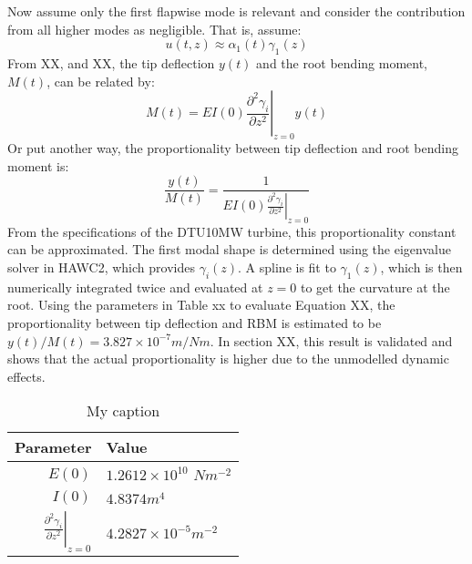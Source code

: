 Now assume only the first flapwise mode is relevant and consider the contribution from all higher modes as negligible. That is, assume:
\begin{equation}
    u(t, z) \approx  \alpha_1(t) \gamma_1(z)
\end{equation}
From XX, and XX, the tip deflection $y(t)$ and the root bending moment, $M(t)$, can be related by:
\begin{equation}
    M(t) = EI(0)\left.\frac{\partial ^2 \gamma_i}{\partial z^2}\right\vert_{z=0}y(t)
\end{equation}
Or put another way, the proportionality between tip deflection and root bending moment is:
\begin{equation}
    \frac{y(t)}{M(t)} = \frac{1}{EI(0)\left.\frac{\partial ^2 \gamma_i}{\partial z^2}\right\vert_{z=0}}
\end{equation}
From the specifications of the DTU10MW turbine, this proportionality constant can be approximated. The first modal shape is determined using the eigenvalue solver in HAWC2, which provides $\gamma_i(z)$. A spline is fit to $\gamma_1(z)$, which is then numerically integrated twice and evaluated at $z=0$ to get the curvature at the root. Using the parameters in Table xx to evaluate Equation XX, the proportionality between tip deflection and RBM is estimated to be $y(t)/M(t) = 3.827 \times 10^{-7} m/Nm$. In section XX, this result is validated and shows that the actual proportionality is higher due to the unmodelled dynamic effects.

\begin{table}[H]
\centering
\caption{My caption}
\label{my-label}
\begin{tabular}{r|l}
\textbf{Parameter} & \textbf{Value} \\ \hline
$E(0)$         & $ 1.2612\times 10^{10}$ $Nm^{-2}$   \\
$I(0)$         &     $4.8374 m^4$  \\
   $\left.\frac{\partial ^2 \gamma_i}{\partial z^2}\right\vert_{z=0} $     &    $4.2827\times 10^{-5} m^{-2}$  
\end{tabular}
\end{table}
\\~\\


